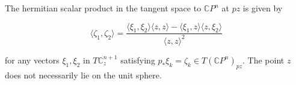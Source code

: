 The hermitian scalar product in the tangent space to $\mathbb{C}P^n$ at $pz$ is given by

$$\langle \zeta_1, \zeta_2 \rangle = \frac{\langle \xi_1, \xi_2 \rangle \langle z, z \rangle - \langle \xi_1, z \rangle \langle z, \xi_2 \rangle}{\langle z, z \rangle^2}$$

for any vectors $\xi_1, \xi_2$ in $T\mathbb{C}_z^{n+1}$ satisfying $p_*\xi_k = \zeta_k \in T(\mathbb{C}P^n)_{pz}$. The point $z$ does not necessarily lie on the unit sphere.
